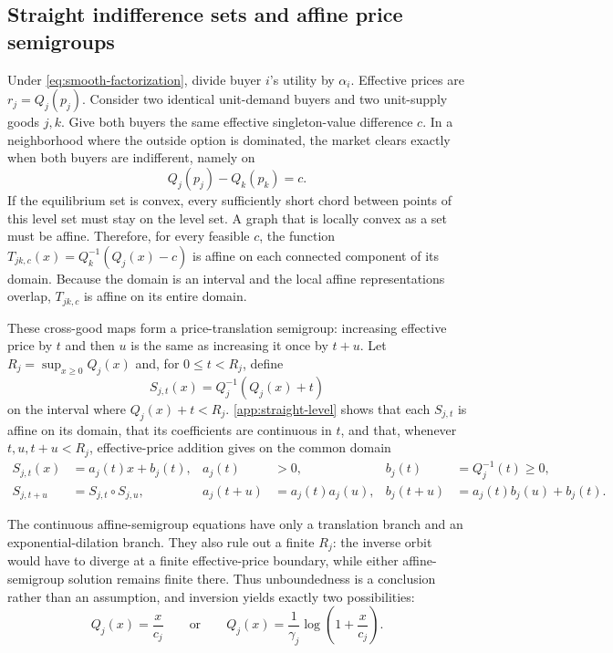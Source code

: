 \documentclass[11pt,a4paper,fleqn]{article}
\theoremstyle{plain}
\theoremstyle{definition}
\begin{document}
\subsection{Straight indifference sets and affine price semigroups}

Under \eqref{eq:smooth-factorization}, divide buyer $i$'s utility by $\alpha_i$. Effective prices are $r_j=Q_j(p_j)$. Consider two identical unit-demand buyers and two unit-supply goods $j,k$. Give both buyers the same effective singleton-value difference $c$. In a neighborhood where the outside option is dominated, the market clears exactly when both buyers are indifferent, namely on
\begin{equation}\label{eq:level-set}
Q_j(p_j)-Q_k(p_k)=c.
\end{equation}
If the equilibrium set is convex, every sufficiently short chord between points of this level set must stay on the level set. A graph that is locally convex as a set must be affine. Therefore, for every feasible $c$, the function $T_{jk,c}(x)=Q_k^{-1}(Q_j(x)-c)$ is affine on each connected component of its domain. Because the domain is an interval and the local affine representations overlap, $T_{jk,c}$ is affine on its entire domain.

These cross-good maps form a price-translation semigroup: increasing effective price by $t$ and then $u$ is the same as increasing it once by $t+u$. Let $R_j=\sup_{x\ge0}Q_j(x)$ and, for $0\le t<R_j$, define
\begin{equation}\label{eq:translation-semigroup}
S_{j,t}(x)=Q_j^{-1}(Q_j(x)+t)
\end{equation}
on the interval where $Q_j(x)+t<R_j$. \ref{app:straight-level} shows that each $S_{j,t}$ is affine on its domain, that its coefficients are continuous in $t$, and that, whenever $t,u,t+u<R_j$, effective-price addition gives on the common domain
\begin{equation}\label{eq:semigroup-identities}
\begin{aligned}
S_{j,t}(x)&=a_j(t)x+b_j(t),
&a_j(t)&>0,
&b_j(t)&=Q_j^{-1}(t)\ge0,\\
S_{j,t+u}&=S_{j,t}\circ S_{j,u},
&a_j(t+u)&=a_j(t)a_j(u),
&b_j(t+u)&=a_j(t)b_j(u)+b_j(t).
\end{aligned}
\end{equation}

The continuous affine-semigroup equations have only a translation branch and an exponential-dilation branch. They also rule out a finite $R_j$: the inverse orbit would have to diverge at a finite effective-price boundary, while either affine-semigroup solution remains finite there. Thus unboundedness is a conclusion rather than an assumption, and inversion yields exactly two possibilities:
\begin{equation}\label{eq:inverse-two-forms}
Q_j(x)=\frac{x}{c_j}
\qquad\text{or}\qquad
Q_j(x)=\frac{1}{\gamma_j}\log\left(1+\frac{x}{c_j}\right).
\end{equation}
\end{document}
